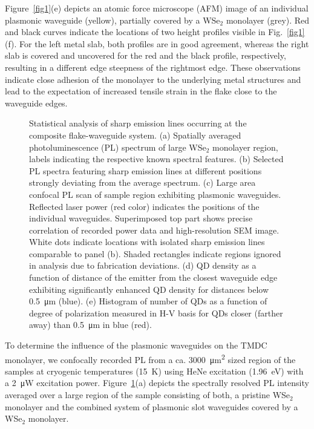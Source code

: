 \documentclass[journal=nalefd,manuscript=letter]{achemso}
\newcommand{\onecolfigurescale}{1.5}
\begin{document}
Figure~\ref{fig1}(e) depicts an atomic force microscope (AFM) image of an individual plasmonic waveguide (yellow), partially covered by a WSe$_2$ monolayer (grey).
Red and black curves indicate the locations of two height profiles visible in Fig.~\ref{fig1}(f).
For the left metal slab, both profiles are in good agreement, whereas the right slab is covered and uncovered for the red and the black profile, respectively, resulting in a different edge steepness of the rightmost edge.
These observations indicate close adhesion of the monolayer to the underlying metal structures and lead to the expectation of increased tensile strain in the flake close to the waveguide edges.


\begin{figure}[!ht]
\scalebox{\onecolfigurescale}{\texttt{[image: fig2.pdf]}}
\renewcommand{\figurename}{Figure}
\caption{\label{fig2}
%
Statistical analysis of sharp emission lines occurring at the composite flake-waveguide system.
(a) Spatially averaged photoluminescence (PL) spectrum of large WSe$_2$ monolayer region, labels indicating the respective known spectral features.
(b) Selected PL spectra featuring sharp emission lines at different positions strongly deviating from the average spectrum.
(c) Large area confocal PL scan of sample region exhibiting plasmonic waveguides. Reflected laser power (red color) indicates the positions of the individual waveguides. Superimposed top part shows precise correlation of recorded power data and high-resolution SEM image. White dots indicate locations with isolated sharp emission lines comparable to panel (b). Shaded rectangles indicate regions ignored in analysis due to fabrication deviations.
(d) QD density as a function of distance of the emitter from the closest waveguide edge exhibiting significantly enhanced QD density for distances below \SI{0.5}{\micro\meter} (blue).
(e) Histogram of number of QDs as a function of degree of polarization measured in H-V basis for QDs closer (farther away) than \SI{0.5}{\micro\meter} in blue (red).
}
\end{figure}
To determine the influence of the plasmonic waveguides on the TMDC monolayer, we confocally recorded PL from a ca. \SI{3000}{\micro\meter\squared} sized region of the samples at cryogenic temperatures (\SI{15}{\kelvin}) using HeNe excitation (\SI{1.96}{\electronvolt}) with a \SI{2}{\micro\watt} excitation power.
Figure~\ref{fig2}(a) depicts the spectrally resolved PL intensity averaged over a large region of the sample consisting of both, a pristine WSe$_2$ monolayer and the combined system of plasmonic slot waveguides covered by a WSe$_2$ monolayer.
\end{document}
